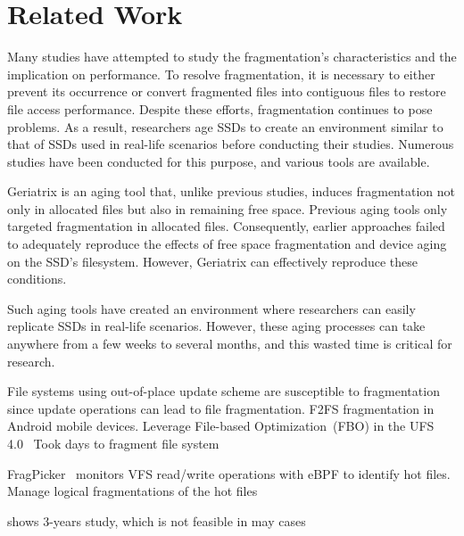 \section{Related Work}
\label{s:related}

Many studies have attempted to study the fragmentation's characteristics and the implication on performance.
To resolve fragmentation, it is necessary to either prevent its occurrence or convert fragmented files into contiguous files to restore file access performance.
Despite these efforts, fragmentation continues to pose problems.
As a result, researchers age SSDs to create an environment similar to that of SSDs used in real-life scenarios before conducting their studies.
Numerous studies have been conducted for this purpose, and various tools are available.


Geriatrix\cite{geriatrix:atc18} is an aging tool that, unlike previous studies, induces fragmentation not only in allocated files but also in remaining free space.
Previous aging tools only targeted fragmentation in allocated files.
Consequently, earlier approaches failed to adequately reproduce the effects of free space fragmentation and device aging on the SSD's filesystem.
However, Geriatrix can effectively reproduce these conditions.

Such aging tools have created an environment where researchers can easily replicate SSDs in real-life scenarios.
However, these aging processes can take anywhere from a few weeks to several months, and this wasted time is critical for research.


File systems using out-of-place update scheme are susceptible to fragmentation since update operations can lead to file fragmentation.
\cite{f2fs-mobile:nvmsa24} F2FS fragmentation in Android mobile devices.
Leverage File-based Optimization~(FBO) in the UFS 4.0~\cite{ufs4.0}
Took days to fragment file system


FragPicker~\cite{fragpicker:sosp21} monitors VFS read/write operations with eBPF to identify hot files.
Manage logical fragmentations of the hot files


\cite{fs-aging:sigmetric97} shows 3-years study, which is not feasible in may cases
